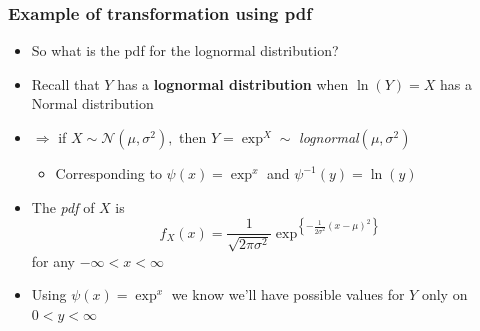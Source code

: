 \documentclass[notes=show,smaller,handout]{beamer}
\newcommand{\N}{\mathcal{N}}
\newenvironment{stepitemize}{\begin{itemize}[<+->]}{\end{itemize} }
\begin{document}
\begin{frame}%

\frametitle{Example of transformation using pdf}

\begin{example}
\begin{stepitemize}
\item So what is the pdf for the lognormal distribution?

\item Recall that $Y$ has a \textbf{lognormal distribution} when $\ln \left(
Y\right) =X$ has a Normal distribution

\item $\Rightarrow $ if $X\sim \N\left( \mu ,\sigma ^{2}\right) ,$ then $%
Y=\exp^X\sim $ \emph{lognormal}$\left( \mu ,\sigma ^{2}\right) $

\begin{stepitemize}
\item Corresponding to $\psi \left( x\right) =\exp^x$ and $\psi
^{-1}\left( y\right) =\ln (y)$
\end{stepitemize}

\item The \emph{pdf} of $X$ is 
\begin{equation*}
f_{X}\left( x\right) =\frac{1}{\sqrt{2\pi \sigma ^{2}}}\exp^{ \left\{ -\frac{1%
}{2\sigma ^{2}}\left( x-\mu \right) ^{2}\right\}}
\end{equation*}%
for any $-\infty <x<\infty $

\item Using $\psi \left( x\right) =\exp^x$ we know we'll have possible
values for $Y$ only on $0<y<\infty $
\end{stepitemize}
\end{example}
\end{frame}%
\end{document}
